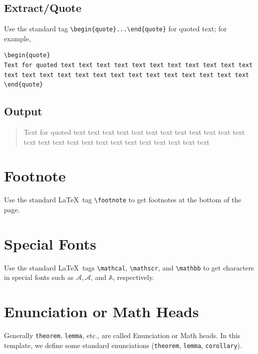 \documentclass[]{imag-ms-template}
\begin{document}
\subsection*{Extract/Quote}

Use the standard tag \verb!\begin{quote}...\end{quote}! for quoted text; for example,

\begin{verbatim}
\begin{quote}
Text for quoted text text text text text text text text text text text
text text text text text text text text text text text text text text 
\end{quote}
\end{verbatim}

\subsection*{Output}

\begin{quote}
Text for quoted text text text text text text text text text text text
text text text text text text text text text text text text text text 
\end{quote}

\section{Footnote}

Use the standard \LaTeX\ tag \verb!\footnote! to get footnotes at the
bottom of the page.

\section{Special Fonts}

Use the standard \LaTeX\ tags \verb!\mathcal!, \verb!\mathscr!, and
\verb!\mathbb! to get characters in special fonts such as
$\mathcal{A}, \mathscr{A}$, and $\mathbb{A}$, respectively.

\section{Enunciation or Math Heads}

Generally \verb!theorem!, \verb!lemma!, etc., are called
Enunciation or Math heads. In this template, we define some standard
enunciations (\verb!theorem!, \verb!lemma!, \verb!corollary!).
\end{document}
